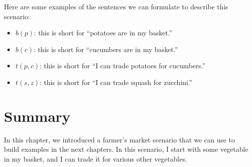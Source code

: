 \documentclass[../../../main.tex]{subfiles}
\begin{document}
\noindent
Here are some examples of the sentences we can formulate to describe this scenario:

\begin{itemize}
  \item{$b(p)$: this is short for ``potatoes are in my basket.''}
  \item{$b(c)$: this is short for ``cucumbers are in my basket.''}
  \item{$t(p, c)$: this is short for ``I can trade potatoes for cucumbers.''}
  \item{$t(s, z)$: this is short for ``I can trade squash for zucchini.''}
\end{itemize}


\section{Summary}

In this chapter, we introduced a farmer's market scenario that we can use to build examples in the next chapters. In this scenario, I start with some vegetable in my basket, and I can trade it for various other vegetables.
\end{document}
